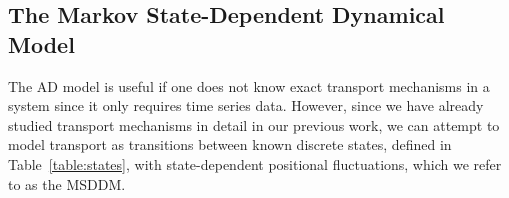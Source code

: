 \documentclass{article}
\begin{document}
  
  


  \subsection{The Markov State-Dependent Dynamical Model}\label{section:msm_results}
  
  The AD model is useful if one does not know exact transport mechanisms 
  in a system since it only requires time series data. However, since we have
  already studied transport mechanisms in detail in our previous work, we can
  attempt to model transport as transitions between known discrete
  states, defined in Table~\ref{table:states}, with state-dependent positional
  fluctuations, which we 
  refer to as
  the MSDDM.
\end{document}
